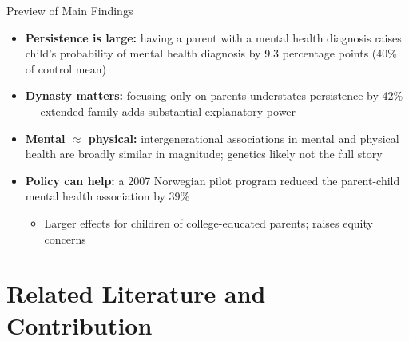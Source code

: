 \documentclass[aspectratio=169]{beamer}
\begin{document}
\begin{frame}{Preview of Main Findings}
  \begin{itemize}
    \item \textbf{Persistence is large:} having a parent with a mental health diagnosis raises child's probability of mental health diagnosis by 9.3 percentage points (40\% of control mean)
    \item \textbf{Dynasty matters:} focusing only on parents understates persistence by 42\% --- extended family adds substantial explanatory power
    \item \textbf{Mental $\approx$ physical:} intergenerational associations in mental and physical health are broadly similar in magnitude; genetics likely not the full story
    \item \textbf{Policy can help:} a 2007 Norwegian pilot program reduced the parent-child mental health association by 39\%
    \begin{itemize}
      \item Larger effects for children of college-educated parents; raises equity concerns
    \end{itemize}
  \end{itemize}
\end{frame}

\section{Related Literature and Contribution}
\end{document}
